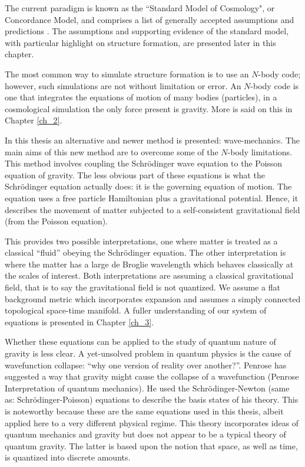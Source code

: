 The current paradigm is known as the ``Standard Model of Cosmology", or Concordance Model, and comprises a list of generally accepted assumptions and predictions \citep{bib_lah}. The assumptions and supporting evidence of the standard model, with particular highlight on structure formation, are presented later in this chapter.

The most common way to simulate structure formation is to use an $N$-body code; however, such simulations are not without limitation or error. An $N$-body code is one that integrates the equations of motion of many bodies (particles), in a cosmological simulation the only force present is gravity. More is said on this in Chapter \ref{ch_2}.

In this thesis an alternative and newer method is presented: wave-mechanics. The main aims of this new method are to overcome some of the $N$-body limitations. This method involves coupling the Schr\"odinger wave equation to the Poisson equation of gravity. The less obvious part of these equations is what the Schr\"odinger equation actually does: it is the governing equation of motion. The equation uses a free particle Hamiltonian  plus a gravitational potential. Hence, it describes the movement of matter subjected to a self-consistent gravitational field (from the Poisson equation). %

This provides two possible interpretations, one where matter is treated as a classical ``fluid'' obeying the Schr\"odinger equation. The other interpretation is where the matter has a large de Broglie wavelength which behaves classically at the scales of interest. Both interpretations are assuming a classical gravitational field, that is to say the gravitational field is not quantized. We assume a flat background metric which incorporates expansion and assumes a simply connected topological space-time manifold. A fuller understanding of our system of equations is presented in Chapter \ref{ch_3}.

Whether these equations can be applied to the study of quantum nature of gravity is less clear. A yet-unsolved problem in quantum physics is the cause of wavefunction collapse: ``why one version of reality over another?''. Penrose \citep{bib_pen} has suggested a way that gravity might cause the collapse of a wavefunction (Penrose Interpretation of quantum mechanics). He used the Schr\"odinger-Newton (same as: Schr\"odinger-Poisson) equations to describe the basis states of his theory. This is noteworthy because these are the same equations used in this thesis, albeit applied here to a very different physical regime. This theory incorporates ideas of quantum mechanics and gravity but does not appear to be a typical theory of quantum gravity. The latter is based upon the notion that space, as well as time, is quantized into discrete amounts.

